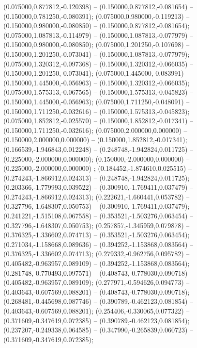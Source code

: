  (0.075000,0.877812,-0.120398) -- (0.150000,0.877812,-0.081654) -- (0.150000,0.781250,-0.080391);
 (0.075000,0.980000,-0.119213) -- (0.150000,0.980000,-0.080850) -- (0.150000,0.877812,-0.081654);
 (0.075000,1.087813,-0.114979) -- (0.150000,1.087813,-0.077979) -- (0.150000,0.980000,-0.080850);
 (0.075000,1.201250,-0.107698) -- (0.150000,1.201250,-0.073041) -- (0.150000,1.087813,-0.077979);
 (0.075000,1.320312,-0.097368) -- (0.150000,1.320312,-0.066035) -- (0.150000,1.201250,-0.073041);
 (0.075000,1.445000,-0.083991) -- (0.150000,1.445000,-0.056963) -- (0.150000,1.320312,-0.066035);
 (0.075000,1.575313,-0.067565) -- (0.150000,1.575313,-0.045823) -- (0.150000,1.445000,-0.056963);
 (0.075000,1.711250,-0.048091) -- (0.150000,1.711250,-0.032616) -- (0.150000,1.575313,-0.045823);
 (0.075000,1.852812,-0.025570) -- (0.150000,1.852812,-0.017341) -- (0.150000,1.711250,-0.032616);
 (0.075000,2.000000,0.000000) -- (0.150000,2.000000,0.000000) -- (0.150000,1.852812,-0.017341);
 (0.166539,-1.946843,0.012248) -- (0.248748,-1.942824,0.011725) -- (0.225000,-2.000000,0.000000);
 (0.150000,-2.000000,0.000000) -- (0.225000,-2.000000,0.000000) ;
 (0.184452,-1.874610,0.025515) -- (0.274243,-1.866912,0.024313) -- (0.248748,-1.942824,0.011725);
 (0.203366,-1.779993,0.039522) -- (0.300910,-1.769411,0.037479) -- (0.274243,-1.866912,0.024313);
 (0.222621,-1.660441,0.053782) -- (0.327796,-1.648307,0.050753) -- (0.300910,-1.769411,0.037479);
 (0.241221,-1.515108,0.067558) -- (0.353521,-1.503276,0.063454) -- (0.327796,-1.648307,0.050753);
 (0.257857,-1.345959,0.079878) -- (0.376325,-1.336602,0.074713) -- (0.353521,-1.503276,0.063454);
 (0.271034,-1.158668,0.089636) -- (0.394252,-1.153868,0.083564) -- (0.376325,-1.336602,0.074713);
 (0.279332,-0.962756,0.095782) -- (0.405482,-0.963957,0.089109) -- (0.394252,-1.153868,0.083564);
 (0.281748,-0.770493,0.097571) -- (0.408743,-0.778030,0.090718) -- (0.405482,-0.963957,0.089109);
 (0.277971,-0.594626,0.094773) -- (0.403643,-0.607569,0.088201) -- (0.408743,-0.778030,0.090718);
 (0.268481,-0.445698,0.087746) -- (0.390789,-0.462123,0.081854) -- (0.403643,-0.607569,0.088201);
 (0.254406,-0.330065,0.077322) -- (0.371609,-0.347619,0.072385) -- (0.390789,-0.462123,0.081854);
 (0.237207,-0.249338,0.064585) -- (0.347990,-0.265839,0.060723) -- (0.371609,-0.347619,0.072385);
